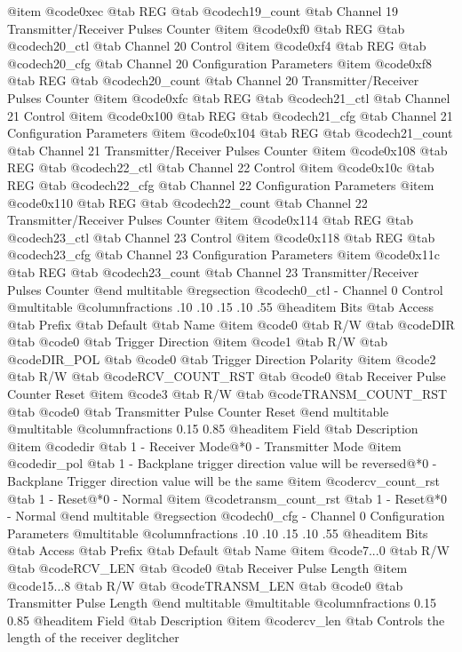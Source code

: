 @item @code{0xec} @tab
REG @tab
@code{ch19_count} @tab
Channel 19 Transmitter/Receiver Pulses Counter
@item @code{0xf0} @tab
REG @tab
@code{ch20_ctl} @tab
Channel 20 Control
@item @code{0xf4} @tab
REG @tab
@code{ch20_cfg} @tab
Channel 20 Configuration Parameters
@item @code{0xf8} @tab
REG @tab
@code{ch20_count} @tab
Channel 20 Transmitter/Receiver Pulses Counter
@item @code{0xfc} @tab
REG @tab
@code{ch21_ctl} @tab
Channel 21 Control
@item @code{0x100} @tab
REG @tab
@code{ch21_cfg} @tab
Channel 21 Configuration Parameters
@item @code{0x104} @tab
REG @tab
@code{ch21_count} @tab
Channel 21 Transmitter/Receiver Pulses Counter
@item @code{0x108} @tab
REG @tab
@code{ch22_ctl} @tab
Channel 22 Control
@item @code{0x10c} @tab
REG @tab
@code{ch22_cfg} @tab
Channel 22 Configuration Parameters
@item @code{0x110} @tab
REG @tab
@code{ch22_count} @tab
Channel 22 Transmitter/Receiver Pulses Counter
@item @code{0x114} @tab
REG @tab
@code{ch23_ctl} @tab
Channel 23 Control
@item @code{0x118} @tab
REG @tab
@code{ch23_cfg} @tab
Channel 23 Configuration Parameters
@item @code{0x11c} @tab
REG @tab
@code{ch23_count} @tab
Channel 23 Transmitter/Receiver Pulses Counter
@end multitable 
@regsection @code{ch0_ctl} - Channel 0 Control
@multitable @columnfractions .10 .10 .15 .10 .55
@headitem Bits @tab Access @tab Prefix @tab Default @tab Name
@item @code{0}
@tab R/W @tab
@code{DIR}
@tab @code{0} @tab 
Trigger Direction
@item @code{1}
@tab R/W @tab
@code{DIR_POL}
@tab @code{0} @tab 
Trigger Direction Polarity
@item @code{2}
@tab R/W @tab
@code{RCV_COUNT_RST}
@tab @code{0} @tab 
Receiver Pulse Counter Reset
@item @code{3}
@tab R/W @tab
@code{TRANSM_COUNT_RST}
@tab @code{0} @tab 
Transmitter Pulse Counter Reset
@end multitable
@multitable @columnfractions 0.15 0.85
@headitem Field @tab Description
@item @code{dir} @tab 1 - Receiver Mode@*0 - Transmitter Mode
@item @code{dir_pol} @tab 1 - Backplane trigger direction value will be reversed@*0 - Backplane Trigger direction value will be the same
@item @code{rcv_count_rst} @tab 1 - Reset@*0 - Normal
@item @code{transm_count_rst} @tab 1 - Reset@*0 - Normal
@end multitable
@regsection @code{ch0_cfg} - Channel 0 Configuration Parameters
@multitable @columnfractions .10 .10 .15 .10 .55
@headitem Bits @tab Access @tab Prefix @tab Default @tab Name
@item @code{7...0}
@tab R/W @tab
@code{RCV_LEN}
@tab @code{0} @tab 
Receiver Pulse Length
@item @code{15...8}
@tab R/W @tab
@code{TRANSM_LEN}
@tab @code{0} @tab 
Transmitter Pulse Length
@end multitable
@multitable @columnfractions 0.15 0.85
@headitem Field @tab Description
@item @code{rcv_len} @tab Controls the length of the receiver deglitcher

